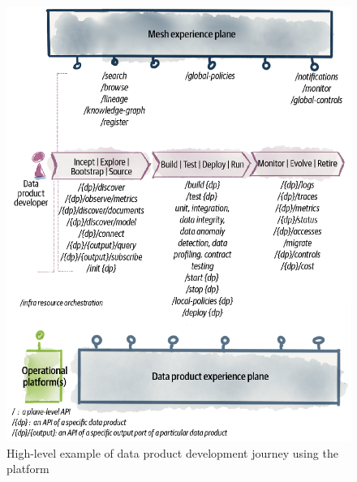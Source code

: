 \documentclass[12pt, a4paper]{book}
\begin{document}
\begin{figure}[h]
	\begin{framed}
		\centering
		\includegraphics[width=12cm]{DataProductDevJourney.png}
		\caption{High-level example of data product development journey using the platform}
		\label{DataProductDevJourney}
	\end{framed}
\end{figure}
\end{document}
